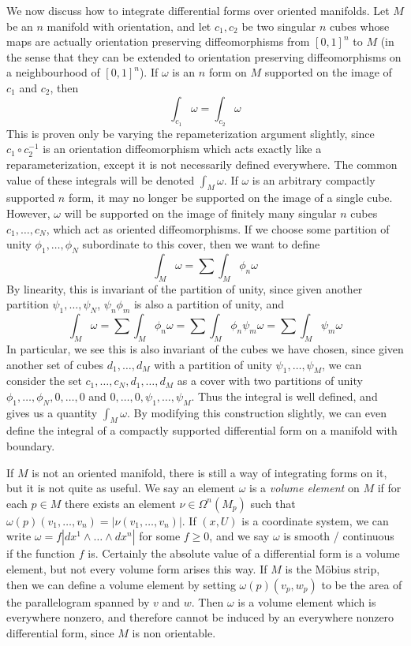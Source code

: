 We now discuss how to integrate differential forms over oriented manifolds. Let $M$ be an $n$ manifold with orientation, and let $c_1,c_2$ be two singular $n$ cubes whose maps are actually orientation preserving diffeomorphisms from $[0,1]^n$ to $M$ (in the sense that they can be extended to orientation preserving diffeomorphisms on a neighbourhood of $[0,1]^n$). If $\omega$ is an $n$ form on $M$ supported on the image of $c_1$ and $c_2$, then
%
\[ \int_{c_1} \omega = \int_{c_2} \omega \]
%
This is proven only be varying the repameterization argument slightly, since $c_1 \circ c_2^{-1}$ is an orientation diffeomorphism which acts exactly like a reparameterization, except it is not necessarily defined everywhere. The common value of these integrals will be denoted $\int_M \omega$. If $\omega$ is an arbitrary compactly supported $n$ form, it may no longer be supported on the image of a single cube. However, $\omega$ will be supported on the image of finitely many singular $n$ cubes $c_1, \dots, c_N$, which act as oriented diffeomorphisms. If we choose some partition of unity $\phi_1, \dots, \phi_N$ subordinate to this cover, then we want to define
%
\[ \int_M \omega = \sum \int_M \phi_n \omega \]
%
By linearity, this is invariant of the partition of unity, since given another partition $\psi_1, \dots, \psi_N$, $\psi_n \phi_m$ is also a partition of unity, and
%
\[ \int_M \omega = \sum \int_M \phi_n \omega = \sum \int_M \phi_n \psi_m \omega = \sum \int_M \psi_m \omega \]
%
In particular, we see this is also invariant of the cubes we have chosen, since given another set of cubes $d_1, \dots, d_M$ with a partition of unity $\psi_1, \dots, \psi_M$, we can consider the set $c_1, \dots, c_N, d_1, \dots, d_M$ as a cover with two partitions of unity $\phi_1, \dots, \phi_N, 0, \dots, 0$ and $0, \dots, 0, \psi_1, \dots, \psi_M$. Thus the integral is well defined, and gives us a quantity $\int_M \omega$. By modifying this construction slightly, we can even define the integral of a compactly supported differential form on a manifold with boundary.

If $M$ is not an oriented manifold, there is still a way of integrating forms on it, but it is not quite as useful. We say an element $\omega$ is a \emph{volume element} on $M$ if for each $p \in M$ there exists an element $\nu \in \Omega^n(M_p)$ such that $\omega(p)(v_1, \dots, v_n) = |\nu(v_1, \dots, v_n)|$. If $(x,U)$ is a coordinate system, we can write $\omega = f |dx^1 \wedge \dots \wedge dx^n|$ for some $f \geq 0$, and we say $\omega$ is smooth / continuous if the function $f$ is. Certainly the absolute value of a differential form is a volume element, but not every volume form arises this way. If $M$ is the M\"{o}bius strip, then we can define a volume element by setting $\omega(p)(v_p, w_p)$ to be the area of the parallelogram spanned by $v$ and $w$. Then $\omega$ is a volume element which is everywhere nonzero, and therefore cannot be induced by an everywhere nonzero differential form, since $M$ is non orientable.







